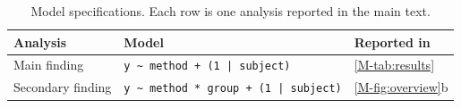 \begin{table}[htbp]
\centering
\footnotesize
\caption{Model specifications. Each row is one analysis reported in the main
text.}
\label{tab:supp-details}
\begin{tabular}{@{}>{\raggedright\arraybackslash}p{3cm}>{\raggedright\arraybackslash}p{7cm}>{\raggedright\arraybackslash}p{4cm}@{}}
\toprule
\textbf{Analysis} & \textbf{Model} & \textbf{Reported in} \\
\midrule
Main finding & \texttt{y \textasciitilde{} method + (1 | subject)} & \cref{M-tab:results} \\ \addlinespace
Secondary finding & \texttt{y \textasciitilde{} method * group + (1 | subject)} & \cref{M-fig:overview}b \\
\bottomrule
\end{tabular}
\end{table}
